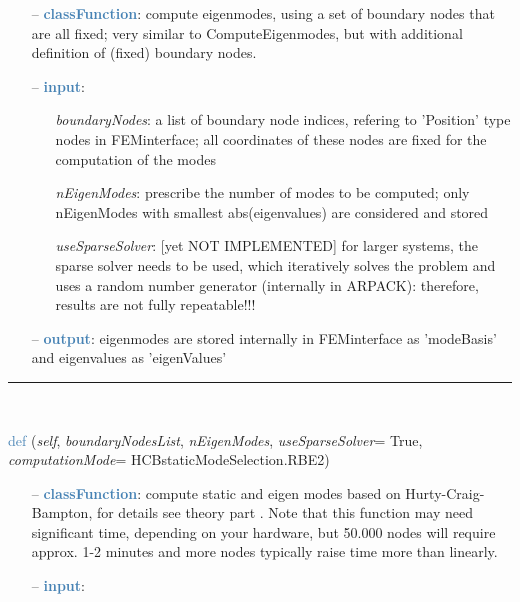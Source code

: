 \begin{itemize}[leftmargin=1.4cm]
\begin{itemize}[leftmargin=0.5cm]
\begin{itemize}[leftmargin=1.4cm]
\begin{itemize}[leftmargin=0.5cm]
\begin{flushleft}
\end{flushleft}
\setlength{\itemindent}{0.7cm}
\begin{itemize}[leftmargin=0.7cm]
  \item[--]  \textcolor{steelblue}{\bf classFunction}: compute eigenmodes, using a set of boundary nodes that are all fixed; very similar to ComputeEigenmodes, but with additional definition of (fixed) boundary nodes.  \item[--]  \textcolor{steelblue}{\bf input}: \vspace{-6pt}
  \begin{itemize}[leftmargin=1.2cm]
\setlength{\itemindent}{-0.7cm}
    \item[] {\it boundaryNodes}: a list of boundary node indices, refering to 'Position' type nodes in FEMinterface; all coordinates of these nodes are fixed for the computation of the modes
    \item[] {\it   nEigenModes}: prescribe the number of modes to be computed; only nEigenModes with smallest abs(eigenvalues) are considered and stored
    \item[] {\it   useSparseSolver}: [yet NOT IMPLEMENTED] for larger systems, the sparse solver needs to be used, which iteratively solves the problem and uses a random number generator (internally in ARPACK): therefore, results are not fully repeatable!!!
  \end{itemize}
  \item[--]  \textcolor{steelblue}{\bf output}: eigenmodes are stored internally in FEMinterface as 'modeBasis' and eigenvalues as 'eigenValues'\vspace{12pt}\end{itemize}
%
\noindent\rule{8cm}{0.75pt}\vspace{1pt} \\ 
\begin{flushleft}
\noindent \textcolor{steelblue}{def {\bf {}}}\label{sec:FEM:FEMinterface:ComputeHurtyCraigBamptonModes}
({\it self}, {\it boundaryNodesList}, {\it nEigenModes}, {\it useSparseSolver}= True, {\it computationMode}= HCBstaticModeSelection.RBE2)
\end{flushleft}
\setlength{\itemindent}{0.7cm}
\begin{itemize}[leftmargin=0.7cm]
  \item[--]  \textcolor{steelblue}{\bf classFunction}: compute static  and eigen modes based on Hurty-Craig-Bampton, for details see theory part . Note that this function may need significant time, depending on your hardware, but 50.000 nodes will require approx. 1-2 minutes and more nodes typically raise time more than linearly.  \item[--]  \textcolor{steelblue}{\bf input}: \vspace{-6pt}

\end{itemize}
\end{itemize}
\end{itemize}
\end{itemize}
\end{itemize}
